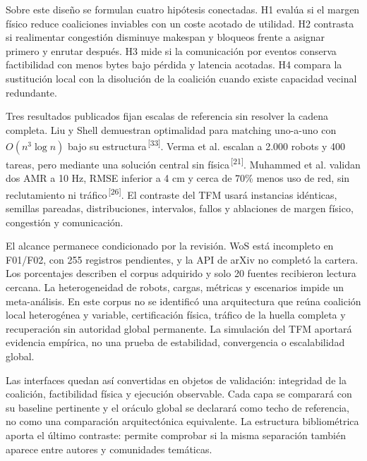 \documentclass[10pt,letterpaper]{article}
\newcommand{\citen}[1]{\textsuperscript{\,[#1]}}
\begin{document}
\fontsize{8.50}{9.25}\selectfont
Sobre este diseño se formulan cuatro hipótesis conectadas. H1 evalúa si el margen físico reduce coaliciones inviables con un coste acotado de utilidad. H2 contrasta si realimentar congestión disminuye makespan y bloqueos frente a asignar primero y enrutar después. H3 mide si la comunicación por eventos conserva factibilidad con menos bytes bajo pérdida y latencia acotadas. H4 compara la sustitución local con la disolución de la coalición cuando existe capacidad vecinal redundante.

Tres resultados publicados fijan escalas de referencia sin resolver la cadena completa. Liu y Shell demuestran optimalidad para matching uno-a-uno con $O(n^3\log n)$ bajo su estructura\citen{33}. Verma et al. escalan a 2.000 robots y 400 tareas, pero mediante una solución central sin física\citen{21}. Muhammed et al. validan dos AMR a 10 Hz, RMSE inferior a 4 cm y cerca de 70\% menos uso de red, sin reclutamiento ni tráfico\citen{26}. El contraste del TFM usará instancias idénticas, semillas pareadas, distribuciones, intervalos, fallos y ablaciones de margen físico, congestión y comunicación.

El alcance permanece condicionado por la revisión. WoS está incompleto en F01/F02, con 255 registros pendientes, y la API de arXiv no completó la cartera. Los porcentajes describen el corpus adquirido y solo 20 fuentes recibieron lectura cercana. La heterogeneidad de robots, cargas, métricas y escenarios impide un meta-análisis. En este corpus no se identificó una arquitectura que reúna coalición local heterogénea y variable, certificación física, tráfico de la huella completa y recuperación sin autoridad global permanente. La simulación del TFM aportará evidencia empírica, no una prueba de estabilidad, convergencia o escalabilidad global.

Las interfaces quedan así convertidas en objetos de validación: integridad de la coalición, factibilidad física y ejecución observable. Cada capa se comparará con su baseline pertinente y el oráculo global se declarará como techo de referencia, no como una comparación arquitectónica equivalente. La estructura bibliométrica aporta el último contraste: permite comprobar si la misma separación también aparece entre autores y comunidades temáticas.
\normalsize
\end{document}
